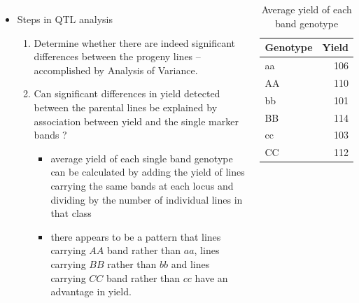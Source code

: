 \documentclass[11pt,dvipsnames,ignorenonframetext,aspectratio=169]{beamer}
\providecommand{\tightlist}{%
  \setlength{\itemsep}{0pt}\setlength{\parskip}{0pt}}
\newcommand{\bcolumns}{\begin{columns}[T, onlytextwidth]}
\newcommand{\ecolumns}{\end{columns}}
\begin{document}
\begin{frame}{}
\protect\hypertarget{section-11}{}
\bcolumns
{}
\small

\begin{itemize}
\tightlist
\item
  Steps in QTL analysis

  \begin{enumerate}
  \footnotesize
  \item Determine whether there are indeed significant differences between the progeny lines -- accomplished by Analysis of Variance.
  \item Can significant differences in yield detected between the parental lines be explained by association between yield and the single marker bands ?
    \begin{itemize}
    \footnotesize
    \item average yield of each single band genotype can be calculated by adding the yield of lines carrying the same bands at each locus and dividing by the number of individual lines in that class
    \item there appears to be a pattern that lines carrying $AA$ band rather than $aa$, lines carrying $BB$ rather than $bb$ and lines carrying $CC$ band rather than $cc$ have an advantage in yield.
    \end{itemize}
  \end{enumerate}
\end{itemize}


\renewcommand{\arraystretch}{1}

\begin{table}

\caption{\label{tab:marker-phenotype-data-summary}Average yield of each band genotype}
\centering
\fontsize{6}{8}\selectfont
\begin{tabular}[t]{lr}
\toprule
Genotype & Yield\\
\midrule
aa & 106\\
AA & 110\\
bb & 101\\
BB & 114\\
cc & 103\\
\addlinespace
CC & 112\\
\bottomrule
\end{tabular}
\end{table}

\ecolumns
\end{frame}
\end{document}
